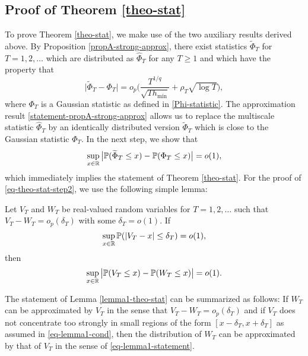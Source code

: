 \subsection*{Proof of Theorem \ref{theo-stat}}


To prove Theorem \ref{theo-stat}, we make use of the two auxiliary results derived above. By Proposition \ref{propA-strong-approx}, there exist statistics $\widetilde{\Phi}_T$ for $T = 1,2,\ldots$ which are distributed as $\widehat{\Phi}_T$ for any $T \ge 1$ and which have the property that 
\begin{equation}\label{statement-propA-strong-approx}
\big| \widetilde{\Phi}_T - \Phi_T \big| = o_p \Big( \frac{T^{1/q}}{\sqrt{T h_{\min}}} + \rho_T \sqrt{\log T} \Big), 
\end{equation}
where $\Phi_T$ is a Gaussian statistic as defined in \eqref{Phi-statistic}. The approximation result \eqref{statement-propA-strong-approx} allows us to replace the multiscale statistic $\widehat{\Phi}_T$ by an identically distributed version $\widetilde{\Phi}_T$ which is close to the Gaussian statistic $\Phi_T$. In the next step, we show that  
\begin{equation}\label{eq-theo-stat-step2}
\sup_{x \in \mathbb{R}} \big| \mathbb{P}(\widetilde{\Phi}_T \le x) - \mathbb{P}(\Phi_T \le x) \big| = o(1), 
\end{equation}
which immediately implies the statement of Theorem \ref{theo-stat}. For the proof of \eqref{eq-theo-stat-step2}, we use the following simple lemma: 
\begin{lemmaA}\label{lemma1-theo-stat}
Let $V_T$ and $W_T$ be real-valued random variables for $T = 1,2,\ldots$ such that $V_T - W_T = o_p(\delta_T)$ with some $\delta_T = o(1)$. If 
\begin{equation}\label{eq-lemma1-cond}
\sup_{x \in \mathbb{R}} \mathbb{P}(|V_T - x| \le \delta_T) = o(1), 
\end{equation}
then 
\begin{equation}\label{eq-lemma1-statement}
\sup_{x \in \mathbb{R}} \big| \mathbb{P}(V_T \le x) - \mathbb{P}(W_T \le x) \big| = o(1). 
\end{equation}
\end{lemmaA}
The statement of Lemma \ref{lemma1-theo-stat} can be summarized as follows: If $W_T$ can be approximated by $V_T$ in the sense that $V_T - W_T = o_p(\delta_T)$ and if $V_T$ does not concentrate too strongly in small regions of the form $[x - \delta_T,x+\delta_T]$ as assumed in \eqref{eq-lemma1-cond}, then the distribution of $W_T$ can be approximated by that of $V_T$ in the sense of \eqref{eq-lemma1-statement}.
